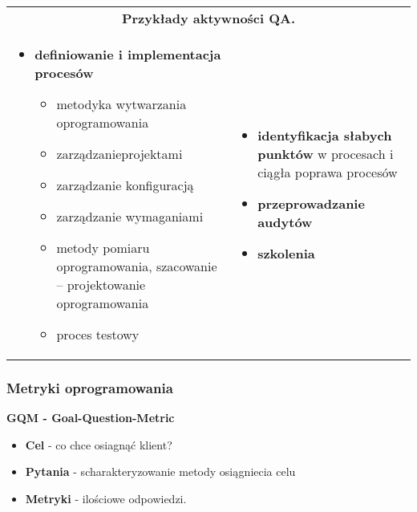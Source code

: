 \documentclass[../main.tex]{subfiles}
\begin{document}
    \begin{table}[H]
        \begin{center}
            \begin{tabular}{p{8cm} p{8cm}}
                \multicolumn{2}{c}{\textbf{Przykłady aktywności QA.}}\\
                \begin{itemize}
                    \item \textbf{definiowanie i implementacja procesów}
                    \begin{itemize}
                        \item metodyka wytwarzania oprogramowania
                        \item zarządzanieprojektami
                        \item zarządzanie konfiguracją
                        \item zarządzanie wymaganiami
                        \item metody pomiaru oprogramowania, szacowanie – projektowanie oprogramowania
                        \item proces testowy
                    \end{itemize}
                \end{itemize}
                &
                \begin{itemize}
                    \item \textbf{identyfikacja słabych punktów} w procesach i ciągła poprawa procesów
                    \item \textbf{przeprowadzanie audytów}
                    \item \textbf{szkolenia}
                \end{itemize}
            \end{tabular}
        \end{center}
    \end{table}

    \subsubsection{Metryki oprogramowania}

    \textbf{GQM - Goal-Question-Metric}
    \begin{itemize}
        \item \textbf{Cel} - co chce osiagnąć klient?
        \item \textbf{Pytania} - scharakteryzowanie metody osiągniecia celu
        \item \textbf{Metryki} - ilościowe odpowiedzi.
\end{itemize}
\end{document}
